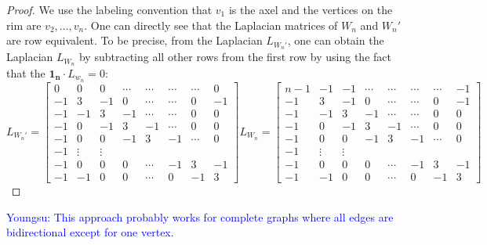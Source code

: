 \documentclass[11pt,reqno]{amsart}
\newcommand{\youngsu}[1]{{\textcolor{blue}{Youngsu: #1}}}
\theoremstyle{definition}
\theoremstyle{plain}
\begin{document}
\begin{proof}
We use the labeling convention that $v_1$ is the axel and the vertices on the rim are $v_2, \dots, v_{n}$. One can directly see that the Laplacian matrices of $W_n$ and $W_n'$ are row equivalent. To be precise, from the Laplacian $L_{W_n'}$, one can obtain the Laplacian $L_{W_n}$ by subtracting all other rows from the first row by using the fact that the $\mathbf{1_n} \cdot L_{w_n} = 0$:
\begin{equation*}
L_{W_n'} = 
\left[
\begin{array}{c|ccccccc}
0 & 0 & 0 & \cdots & \cdots & \cdots & \cdots & 0 \\
\hline
-1 & 3 & -1 & 0 & \cdots & \cdots & 0 & -1 \\
-1 & - 1& 3 & -1 & \cdots & \cdots & 0 & 0 \\
-1 & 0 & - 1& 3 & -1 & \cdots & 0 & 0 \\
-1 & 0 & 0 & - 1& 3 & -1 & \cdots & 0 \\
-1 & \vdots & \vdots \\
-1 & 0 & 0 & 0 & \cdots & -1& 3 & -1 \\
-1 & -1 & 0 & 0 & \cdots& 0 & -1 & 3 
\end{array}
\right]
L_{W_n} =
\left[
\begin{array}{c|cccccccc}
n-1 & -1 & -1 & \cdots & \cdots & \cdots & \cdots & -1 \\
\hline
-1 & 3 & -1 & 0 & \cdots & \cdots & 0 & -1 \\
-1 & - 1& 3 & -1 & \cdots & \cdots & 0 & 0 \\
-1 & 0 & - 1& 3 & -1 & \cdots & 0 & 0 \\
-1 & 0 & 0 & - 1& 3 & -1 & \cdots & 0 \\
-1 & \vdots & \vdots \\
-1 & 0 & 0 & 0 & \cdots & -1& 3 & -1 \\
-1 & -1 & 0 & 0 & \cdots& 0 & -1 & 3 
\end{array}
\right]
\end{equation*}

\end{proof}

\youngsu{This approach probably works for complete graphs where all edges are bidirectional except for one vertex.}
\end{document}

